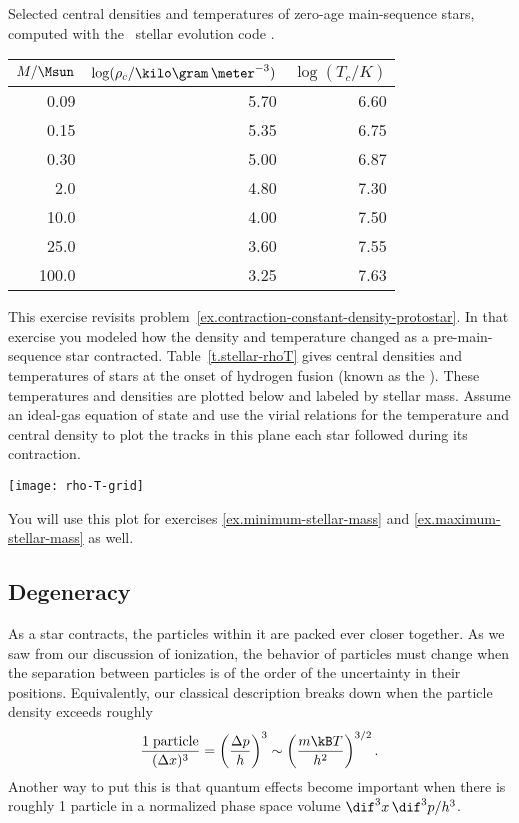 \begin{margintable}
\caption[Central densities and temperatures of zero-age main-sequence stars]{\label{t.stellar-rhoT}Selected central densities and temperatures of zero-age main-sequence stars, computed with the \mesa\ stellar evolution code \citep{Paxton2010Modules-for-Exp}.}
\begin{tabular}{rrr}
$M/\Msun$ & $\log(\rho_{c}/\kilo\gram\,\meter^{-3})$ & $\log(T_{c}/K)$\\
\hline
0.09 & 5.70 & 6.60\\
0.15 & 5.35 & 6.75\\
0.30 & 5.00 & 6.87\\
2.0 & 4.80 & 7.30\\
10.0 & 4.00 & 7.50\\
25.0 & 3.60 & 7.55\\
100.0 & 3.25 & 7.63\\
\end{tabular}
\end{margintable}

\begin{exercisebox}
\label{ex.contraction-to-main-sequence}
This exercise revisits problem~\ref{ex.contraction-constant-density-protostar}. In that exercise you modeled how the density and temperature changed as a pre-main-sequence star contracted. Table~\ref{t.stellar-rhoT} gives central densities and temperatures of stars at the onset of hydrogen fusion (known as the ). These temperatures and densities are plotted below and labeled by stellar mass. Assume an ideal-gas equation of state and use the virial relations for the temperature and central density to plot the tracks in this plane each star followed during its contraction.
\begin{center}
\texttt{[image: rho-T-grid]}
\end{center}
You will use this plot for exercises \ref{ex.minimum-stellar-mass} and \ref{ex.maximum-stellar-mass} as well.
\end{exercisebox}

\subsection{Degeneracy}
\label{s.degeneracy}

As a star contracts, the particles within it are packed ever closer together.  As we saw from our discussion of ionization, the behavior of particles must change when the separation between particles is of the order of the uncertainty in their positions.  Equivalently, our classical description breaks down when the particle density exceeds roughly
\begin{equation}\label{e.heuristic-quantum-density}
    \frac{1\;\textrm{particle}}{(\Delta x)^3} 
    = \left(\frac{\Delta p}{h}\right)^3 
    \sim \left(\frac{m\kB T}{h^2}\right)^{3/2}.
\end{equation}
Another way to put this is that quantum effects become important when there is roughly 1 particle in a normalized phase space volume $\dif^{3}x\,\dif^{3}p/h^{3}$.

